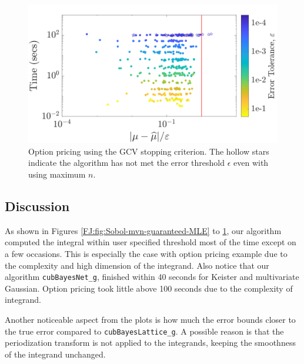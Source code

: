 \documentclass[graybox,footinfo]{svmult}
\newcommand{\JRNote}[1]{{\textcolor{green}{JR: #1}}}
\begin{document}
\begin{figure}
\centering
\includegraphics[width=0.95\linewidth]{"figures/Sobol/Sobol_optPrice_guaranteed_time_GCV__d12_r1_2019-Sep-1"}
\caption[Sobol: Option pricing guaranteed: GCV]{Option pricing using the GCV stopping criterion. The hollow stars indicate the algorithm has not met the error threshold $\epsilon$ even with using maximum $n$.}
\label{FJ:fig:Sobol-optprice-guaranteed-GCV}
\end{figure}




\subsection{Discussion}

As shown in Figures \ref{FJ:fig:Sobol-mvn-guaranteed-MLE} to \ref{FJ:fig:Sobol-optprice-guaranteed-GCV}, our algorithm computed the integral within user specified threshold most of the time except on a few occasions. This is especially the case with option pricing example due to the complexity and high dimension of the integrand. 
Also notice that our algorithm \texttt{cubBayesNet\_g}, finished within 40 seconds for Keister and multivariate Gaussian. Option pricing took little above 100 seconds due to the complexity of integrand.

Another noticeable aspect from the plots is how much the error bounds closer to the true error compared to \texttt{cubBayesLattice\_g}. 
A possible reason is that the periodization transform is not applied to the integrands, keeping the smoothness of the integrand unchanged.

\end{document}
